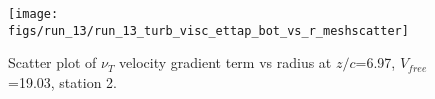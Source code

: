 \begin{figure}[H]
\centering
\texttt{[image: figs/run\_13/run\_13\_turb\_visc\_ettap\_bot\_vs\_r\_meshscatter]}
\caption{Scatter plot of $\nu_T$ velocity gradient term vs radius at $z/c$=6.97, $V_{free}$=19.03, station 2.}
\label{fig:run_13_turb_visc_ettap_bot_vs_r_meshscatter}
\end{figure}


